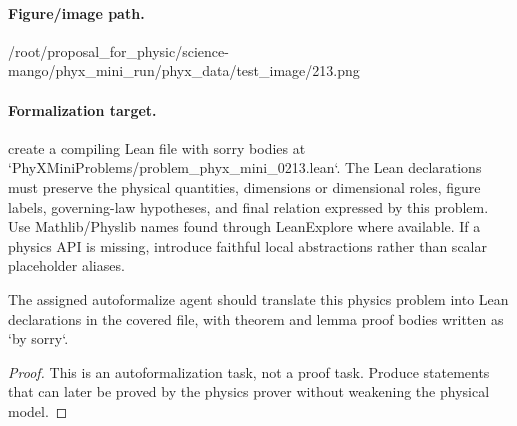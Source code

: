 \paragraph{Figure/image path.}
/root/proposal\_for\_physic/science-mango/phyx\_mini\_run/phyx\_data/test\_image/213.png

\paragraph{Formalization target.}
create a compiling Lean file with sorry bodies at `PhyXMiniProblems/problem\_phyx\_mini\_0213.lean`. The Lean declarations must preserve the physical quantities, dimensions or dimensional roles, figure labels, governing-law hypotheses, and final relation expressed by this problem.
Use Mathlib/Physlib names found through LeanExplore where available. If a physics API is missing, introduce faithful local abstractions rather than scalar placeholder aliases.

\begin{theorem}
\label{thm:physics:phyx_mini_0213:target}
The assigned autoformalize agent should translate this physics problem into Lean declarations in the covered file, with theorem and lemma proof bodies written as `by sorry`.
\end{theorem}
\begin{proof}
This is an autoformalization task, not a proof task. Produce statements that can later be proved by the physics prover without weakening the physical model.
\end{proof}

